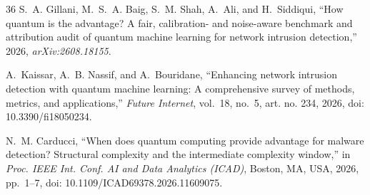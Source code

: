 \begin{thebibliography}{36}
S.~A. Gillani, M.~S.~A. Baig, S.~M. Shah, A.~Ali, and H.~Siddiqui, ``How quantum
is the advantage? A fair, calibration- and noise-aware benchmark and attribution
audit of quantum machine learning for network intrusion detection,'' 2026,
\emph{arXiv:2608.18155}.

A.~Kaissar, A.~B. Nassif, and A.~Bouridane, ``Enhancing network intrusion
detection with quantum machine learning: A comprehensive survey of methods,
metrics, and applications,'' \emph{Future Internet}, vol.~18, no.~5,
art. no. 234, 2026, doi: 10.3390/fi18050234.

N.~M. Carducci, ``When does quantum computing provide advantage for malware
detection? Structural complexity and the intermediate complexity window,'' in
\emph{Proc. IEEE Int. Conf. AI and Data Analytics (ICAD)}, Boston, MA, USA,
2026, pp.~1--7, doi: 10.1109/ICAD69378.2026.11609075.

\end{thebibliography}
